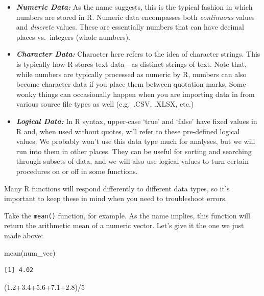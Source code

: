 \documentclass[
  letterpaper,
  DIV=11,
  numbers=noendperiod]{scrreprt}
\newenvironment{Shaded}{\begin{snugshade}}{\end{snugshade}}
\newcommand{\DecValTok}[1]{\textcolor[rgb]{0.68,0.00,0.00}{#1}}
\newcommand{\FloatTok}[1]{\textcolor[rgb]{0.68,0.00,0.00}{#1}}
\newcommand{\FunctionTok}[1]{\textcolor[rgb]{0.28,0.35,0.67}{#1}}
\newcommand{\NormalTok}[1]{\textcolor[rgb]{0.00,0.23,0.31}{#1}}
\newcommand{\SpecialCharTok}[1]{\textcolor[rgb]{0.37,0.37,0.37}{#1}}
\begin{document}
\begin{itemize}
\item
  \textbf{\emph{Numeric Data:}} As the name suggests, this is the
  typical fashion in which numbers are stored in R. Numeric data
  encompasses both \emph{continuous} values and \emph{discrete} values.
  These are essentially numbers that can have decimal places
  vs.~integers (whole numbers).
\item
  \textbf{\emph{Character Data:}} Character here refers to the idea of
  character strings. This is typically how R stores text data---as
  distinct strings of text. Note that, while numbers are typically
  processed as numeric by R, numbers can also become character data if
  you place them between quotation marks. Some wonky things can
  occasionally happen when you are importing data in from various source
  file types as well (e.g.~.CSV, .XLSX, etc.)
\item
  \textbf{\emph{Logical Data:}} In R syntax, upper-case `true' and
  `false' have fixed values in R and, when used without quotes, will
  refer to these pre-defined logical values. We probably won't use this
  data type much for analyses, but we will run into them in other
  places. They can be useful for sorting and searching through subsets
  of data, and we will also use logical values to turn certain
  procedures on or off in some functions.
\end{itemize}

Many R functions will respond differently to different data types, so
it's important to keep these in mind when you need to troubleshoot
errors.

Take the \texttt{mean()} function, for example. As the name implies,
this function will return the arithmetic mean of a numeric vector. Let's
give it the one we just made above:

\begin{Shaded}
\begin{Highlighting}[]
\FunctionTok{mean}\NormalTok{(num\_vec)}
\end{Highlighting}
\end{Shaded}

\begin{verbatim}
[1] 4.02
\end{verbatim}

\begin{Shaded}
\begin{Highlighting}[]
\NormalTok{(}\FloatTok{1.2+3.4+5.6+7.1+2.8}\NormalTok{)}\SpecialCharTok{/}\DecValTok{5}
\end{Highlighting}
\end{Shaded}
\end{document}
